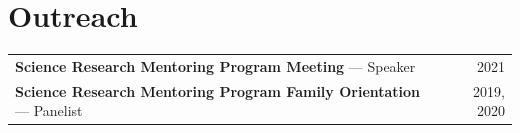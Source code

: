 \section{Outreach}

\begin{tabularx}{\linewidth}{@{}Xr@{}}
\textbf{Science Research Mentoring Program Meeting} --- Speaker
  & 2021 \\[2pt]

\textbf{Science Research Mentoring Program Family Orientation} --- Panelist
  & 2019, 2020
\end{tabularx}